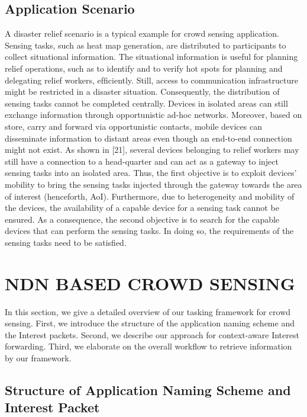 \documentclass[10pt, conference, compsocconf]{IEEEtran}
\begin{document}
\subsection{Application Scenario}

A disaster relief scenario is a typical example for crowd sensing application. Sensing tasks, such as heat map generation, are distributed to participants to collect situational information. The situational information is useful for planning relief operations, such as to identify and to verify hot spots for planning and delegating relief workers, efﬁciently. Still, access to communication infrastructure might be restricted in a disaster situation. Consequently, the distribution of sensing tasks cannot be completed centrally. Devices in isolated areas can still exchange information through opportunistic ad-hoc networks. Moreover, based on store, carry and forward via opportunistic contacts, mobile devices can disseminate information to distant areas even though an end-to-end connection might not exist. As shown in [21], several devices belonging to relief workers may still have a connection to a head-quarter and can act as a gateway to inject sensing tasks into an isolated area. Thus, the ﬁrst objective is to exploit devices’ mobility to bring the sensing tasks injected through the gateway towards the area of interest (henceforth, AoI). Furthermore, due to heterogeneity and mobility of the devices, the availability of a capable device for a sensing task cannot be ensured. As a consequence, the second objective is to search for the capable devices that can perform the sensing tasks. In doing so, the requirements of the sensing tasks need to be satisﬁed.

\section{NDN BASED CROWD SENSING}

In this section, we give a detailed overview of our tasking framework for crowd sensing. First, we introduce the structure of the application naming scheme and the Interest packets. Second, we describe our approach for context-aware Interest forwarding. Third, we elaborate on the overall workﬂow to retrieve information by our framework.

\subsection{Structure of Application Naming Scheme and Interest Packet}
\end{document}
